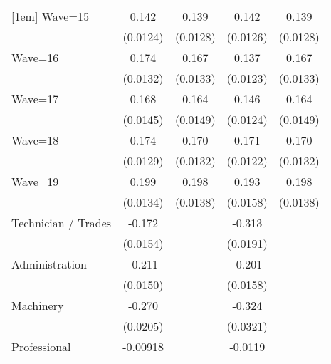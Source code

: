 {\begin{tabular}{l*{4}{c}}
[1em]
Wave=15             &       0.142\sym{***}&       0.139\sym{***}&       0.142\sym{***}&       0.139\sym{***}\\
                    &    (0.0124)         &    (0.0128)         &    (0.0126)         &    (0.0128)         \\
[1em]
Wave=16             &       0.174\sym{***}&       0.167\sym{***}&       0.137\sym{***}&       0.167\sym{***}\\
                    &    (0.0132)         &    (0.0133)         &    (0.0123)         &    (0.0133)         \\
[1em]
Wave=17             &       0.168\sym{***}&       0.164\sym{***}&       0.146\sym{***}&       0.164\sym{***}\\
                    &    (0.0145)         &    (0.0149)         &    (0.0124)         &    (0.0149)         \\
[1em]
Wave=18             &       0.174\sym{***}&       0.170\sym{***}&       0.171\sym{***}&       0.170\sym{***}\\
                    &    (0.0129)         &    (0.0132)         &    (0.0122)         &    (0.0132)         \\
[1em]
Wave=19             &       0.199\sym{***}&       0.198\sym{***}&       0.193\sym{***}&       0.198\sym{***}\\
                    &    (0.0134)         &    (0.0138)         &    (0.0158)         &    (0.0138)         \\
[1em]
Technician / Trades &      -0.172\sym{***}&                     &      -0.313\sym{***}&                     \\
                    &    (0.0154)         &                     &    (0.0191)         &                     \\
[1em]
Administration      &      -0.211\sym{***}&                     &      -0.201\sym{***}&                     \\
                    &    (0.0150)         &                     &    (0.0158)         &                     \\
[1em]
Machinery           &      -0.270\sym{***}&                     &      -0.324\sym{***}&                     \\
                    &    (0.0205)         &                     &    (0.0321)         &                     \\
[1em]
Professional        &    -0.00918         &                     &     -0.0119         &                     \\

\end{tabular}}
